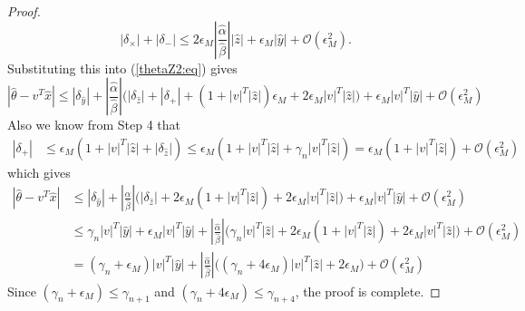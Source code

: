 \documentclass[10pt,a4paper]{amsart}
\newcommand{\eps}{\epsilon}
\newcommand{\eqnref}[1]{(\ref{#1})}
\begin{document}
\begin{proof}
\begin{equation} \label{twoDelta:eq}
|\delta_{\times}| + |\delta_-| \leq 2 \eps_M |\frac{\hat \alpha}{\hat \beta}| |\hat z|  + \eps_M |\hat y| +  \mathcal{O}(\eps_M^2).
\end{equation}
Substituting this into \eqnref{thetaZ2:eq} gives
\[
|\hat \theta - v^T \hat x| \leq
 |\delta_{\hat y}| + |\frac{\hat \alpha}{\hat \beta}| \Big( |\delta_{\hat z}|  + |\delta_{+}| + (1 + |v|^T |\hat z|) \eps_M + 2 \eps_M |v|^T |\hat z| \Big) + \eps_M |v|^T |\hat y| +  \mathcal{O}(\eps_M^2)
\]
Also we know from Step 4 that
\begin{align*}
|\delta_{+}|  &\leq \eps_M (1 + |v|^T |\hat z| + |\delta_{\hat z}|) 
\leq \eps_M (1 + |v|^T |\hat z| + \gamma_n |v|^T |\hat z|) = \eps_M (1 + |v|^T |\hat z|) + \mathcal{O}(\eps_M^2)
\end{align*}
which gives
\begin{align*}
|\hat \theta - v^T \hat x| & \leq
 |\delta_{\hat y}| + |\frac{\hat \alpha}{\hat \beta}| \Big( |\delta_{\hat z}|  + 2 \eps_M (1 + |v|^T |\hat z|) + 2 \eps_M |v|^T |\hat z| \Big) + \eps_M |v|^T |\hat y| +  \mathcal{O}(\eps_M^2)\\
 & \leq  \gamma_n |v|^T |\hat y| + \eps_M |v|^T |\hat y| + |\frac{\hat \alpha}{\hat \beta}| \Big( \gamma_n |v|^T |\hat z|  + 2 \eps_M (1 + |v|^T |\hat z|) + 2 \eps_M |v|^T |\hat z| \Big)  +  \mathcal{O}(\eps_M^2)\\
 & =  (\gamma_n + \eps_M) |v|^T |\hat y| + |\frac{\hat \alpha}{\hat \beta}| \Big( (\gamma_n + 4 \eps_M) |v|^T |\hat z|  + 2 \eps_M \Big)  +  \mathcal{O}(\eps_M^2)
\end{align*}
Since $(\gamma_n + \eps_M) \leq \gamma_{n+1}$ and  $(\gamma_n + 4\eps_M) \leq \gamma_{n+4}$, the proof is complete.
\end{proof}
\end{document}
